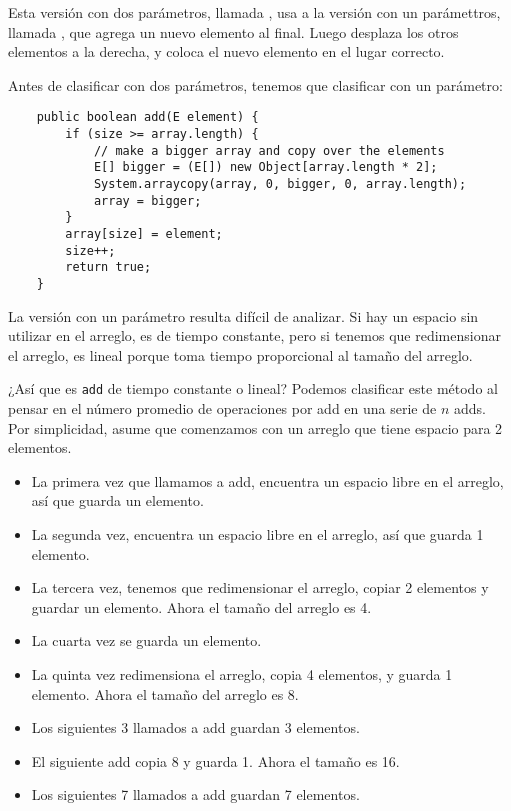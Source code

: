\documentclass[12pt]{book}
\theoremstyle{exercise}
\begin{document}
Esta versión con dos parámetros, llamada , usa a
la versión con un parámettros, llamada , que agrega un
nuevo elemento al final. Luego desplaza los otros elementos a la derecha,
y coloca el nuevo elemento en el lugar correcto.


Antes de clasificar  con dos parámetros, tenemos que
clasificar  con un parámetro:

\begin{verbatim}
    public boolean add(E element) {
        if (size >= array.length) {
            // make a bigger array and copy over the elements
            E[] bigger = (E[]) new Object[array.length * 2];
            System.arraycopy(array, 0, bigger, 0, array.length);
            array = bigger;
        } 
        array[size] = element;
        size++;
        return true;
    }
\end{verbatim}

La versión con un parámetro resulta difícil de analizar. Si hay un espacio
sin utilizar en el arreglo, es de tiempo constante, pero si tenemos que
redimensionar el arreglo, es lineal porque  toma
tiempo proporcional al tamaño del arreglo. 


¿Así que es {\tt add} de tiempo constante o lineal?
Podemos clasificar este método al pensar en el número promedio de
operaciones por add en una serie de $n$ adds. Por simplicidad,
asume que comenzamos con un arreglo que tiene espacio para 2 elementos.

\begin{itemize}

\item
  La primera vez que llamamos a add, encuentra un espacio libre en el arreglo, así que
  guarda un elemento.

\item
  La segunda vez, encuentra un espacio libre en el arreglo, así que guarda 1
  elemento.

\item
  La tercera vez, tenemos que redimensionar el arreglo, copiar 2 elementos y
  guardar un elemento. Ahora el tamaño del arreglo es 4.

\item
  La cuarta vez se guarda un elemento.

\item
  La quinta vez redimensiona el arreglo, copia 4 elementos, y guarda 1
  elemento. Ahora el tamaño del arreglo es 8.

\item
  Los siguientes 3 llamados a add guardan 3 elementos.

\item
  El siguiente add copia 8 y guarda 1. Ahora el tamaño es 16.

\item
  Los siguientes 7 llamados a add guardan 7 elementos.

\end{itemize}
\end{document}
